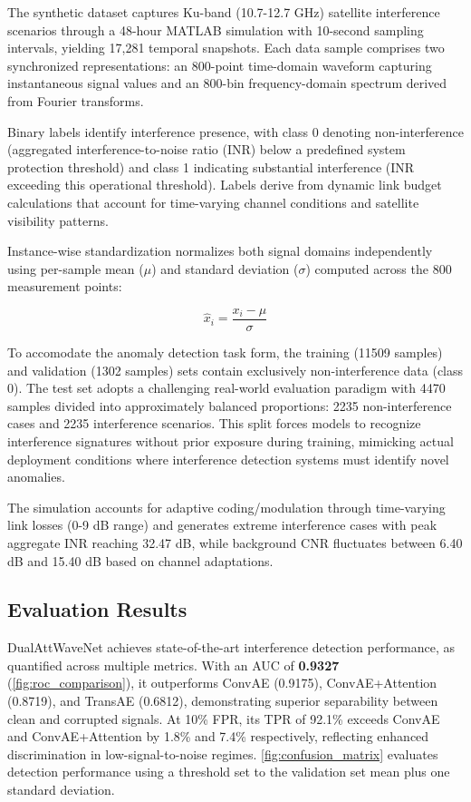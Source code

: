 \documentclass[12pt]{article}
\begin{document}
The synthetic dataset captures Ku-band (10.7-12.7 GHz) satellite interference scenarios through a 48-hour MATLAB simulation with 10-second sampling intervals, yielding 17,281 temporal snapshots. Each data sample comprises two synchronized representations: an 800-point time-domain waveform capturing instantaneous signal values and an 800-bin frequency-domain spectrum derived from Fourier transforms.

Binary labels identify interference presence, with class 0 denoting non-interference (aggregated interference-to-noise ratio (INR) below a predefined system protection threshold) and class 1 indicating substantial interference (INR exceeding this operational threshold). Labels derive from dynamic link budget calculations that account for time-varying channel conditions and satellite visibility patterns.

Instance-wise standardization normalizes both signal domains independently using per-sample mean (\( \mu \)) and standard deviation (\( \sigma \)) computed across the 800 measurement points:

\begin{equation}
    \hat{x}_i = \frac{x_i - \mu}{\sigma}
\end{equation}

To accomodate the anomaly detection task form, the training (11509 samples) and validation (1302 samples) sets contain exclusively non-interference data (class 0). The test set adopts a challenging real-world evaluation paradigm with 4470 samples divided into approximately balanced proportions: 2235 non-interference cases and 2235 interference scenarios. This split forces models to recognize interference signatures without prior exposure during training, mimicking actual deployment conditions where interference detection systems must identify novel anomalies.

The simulation accounts for adaptive coding/modulation through time-varying link losses (0-9 dB range) and generates extreme interference cases with peak aggregate INR reaching 32.47 dB, while background CNR fluctuates between 6.40 dB and 15.40 dB based on channel adaptations.

\subsection{Evaluation Results}

DualAttWaveNet achieves state-of-the-art interference detection performance, as quantified across multiple metrics. With an AUC of \textbf{0.9327} (\autoref{fig:roc_comparison}), it outperforms ConvAE (0.9175), ConvAE+Attention (0.8719), and TransAE (0.6812), demonstrating superior separability between clean and corrupted signals. At 10\% FPR, its TPR of 92.1\% exceeds ConvAE and ConvAE+Attention by 1.8\% and 7.4\% respectively, reflecting enhanced discrimination in low-signal-to-noise regimes. \autoref{fig:confusion_matrix} evaluates detection performance using a threshold set to the validation set mean plus one standard deviation.
\end{document}
